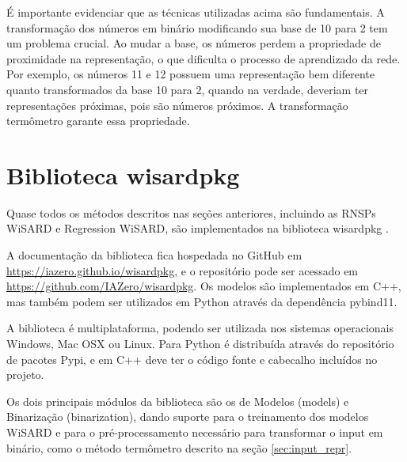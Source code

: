     É importante evidenciar que as técnicas utilizadas acima são fundamentais. A transformação dos números em binário modificando sua base de 10 para 2 tem um problema crucial. Ao mudar a base, os números perdem a propriedade de proximidade na representação, o que dificulta o processo de aprendizado da rede. Por exemplo, os números 11 e 12 possuem uma representação bem diferente quanto transformados da base 10 para 2, quando na verdade, deveriam ter representações próximas, pois são números próximos. A transformação termômetro garante essa propriedade. 
    
\section{Biblioteca wisardpkg}
    Quase todos os métodos descritos nas seções anteriores, incluindo as RNSPs WiSARD e Regression WiSARD, são implementados na biblioteca wisardpkg \cite{wisardpkg}.

    A documentação da biblioteca fica hospedada no GitHub em \url{https://iazero.github.io/wisardpkg}, e o repositório pode ser acessado em \url{https://github.com/IAZero/wisardpkg}. Os modelos são implementados em C++, mas também podem ser utilizados em Python através da dependência pybind11.

    A biblioteca é multiplataforma, podendo ser utilizada nos sistemas operacionais Windows, Mac OSX ou Linux. Para Python é distribuída através do repositório de pacotes Pypi, e em C++ deve ter o código fonte e cabecalho incluídos no projeto.

    Os dois principais módulos da biblioteca são os de Modelos (models) e Binarização (binarization), dando suporte para o treinamento dos modelos WiSARD e para o pré-processamento necessário para transformar o input em binário, como o método termômetro descrito na seção \ref{sec:input_repr}.